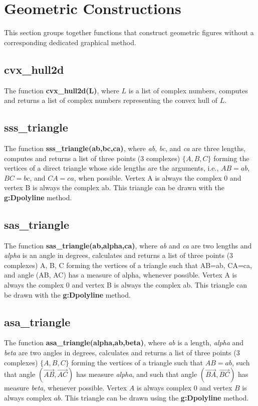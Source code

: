 \section{Geometric Constructions}

This section groups together functions that construct geometric figures without a corresponding dedicated graphical method.

\subsection{cvx\_hull2d}

The function \textbf{cvx\_hull2d(L)}, where $L$ is a list of complex numbers, computes and returns a list of complex numbers representing the convex hull of $L$.

\subsection{sss\_triangle}

The function \textbf{sss\_triangle(ab,bc,ca)}, where \emph{ab}, \emph{bc}, and \emph{ca} are three lengths, computes and returns a list of three points (3 complexes) $\{A,B,C\}$ forming the vertices of a direct triangle whose side lengths are the arguments, i.e., $AB=ab$, $BC=bc$, and $CA=ca$, when possible. Vertex A is always the complex 0 and vertex B is always the complex ab. This triangle can be drawn with the \textbf{g:Dpolyline} method.

\subsection{sas\_triangle}

The function \textbf{sas\_triangle(ab,alpha,ca)}, where \emph{ab} and \emph{ca} are two lengths and \emph{alpha} is an angle in degrees, calculates and returns a list of three points (3 complexes) A, B, C forming the vertices of a triangle such that AB=ab, CA=ca, and angle (AB, AC) has a measure of alpha, whenever possible. Vertex A is always the complex 0 and vertex B is always the complex ab. This triangle can be drawn with the \textbf{g:Dpolyline} method.

\subsection{asa\_triangle}

The function \textbf{asa\_triangle(alpha,ab,beta)}, where \emph{ab} is a length, \emph{alpha} and \emph{beta} are two angles in degrees, calculates and returns a list of three points (3 complexes) $\{A,B,C\}$ forming the vertices of a triangle such that $AB=ab$, such that angle $(\vec{AB},\vec{AC})$ has measure \emph{alpha}, and such that angle $(\vec{BA},\vec{BC})$ has measure \emph{beta}, whenever possible. Vertex $A$ is always complex $0$ and vertex $B$ is always complex $ab$. This triangle can be drawn using the \textbf{g:Dpolyline} method.


